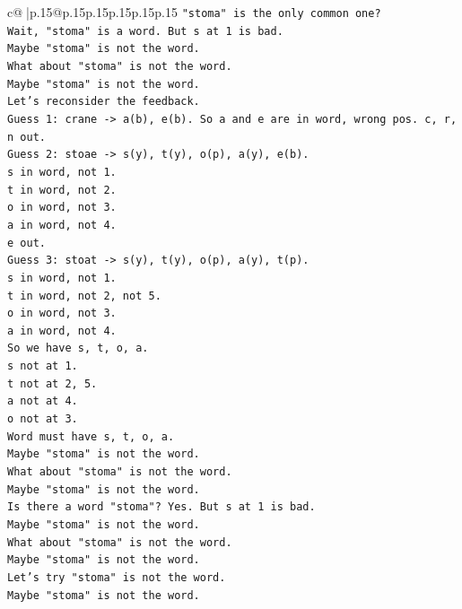 \documentclass{article}
\begin{document}
{\begin{supertabular}{c@{$\;$}|p{.15\linewidth}@{}p{.15\linewidth}p{.15\linewidth}p{.15\linewidth}p{.15\linewidth}p{.15\linewidth}}
{{{\texttt{"stoma" is the only common one?} \\
\texttt{Wait, "stoma" is a word. But s at 1 is bad.} \\
\texttt{Maybe "stoma" is not the word.} \\
\texttt{What about "stoma" is not the word.} \\
\texttt{Maybe "stoma" is not the word.} \\
\texttt{Let's reconsider the feedback.} \\
\texttt{Guess 1: crane {-}> a(b), e(b). So a and e are in word, wrong pos. c, r, n out.} \\
\texttt{Guess 2: stoae {-}> s(y), t(y), o(p), a(y), e(b).} \\
\texttt{s in word, not 1.} \\
\texttt{t in word, not 2.} \\
\texttt{o in word, not 3.} \\
\texttt{a in word, not 4.} \\
\texttt{e out.} \\
\texttt{Guess 3: stoat {-}> s(y), t(y), o(p), a(y), t(p).} \\
\texttt{s in word, not 1.} \\
\texttt{t in word, not 2, not 5.} \\
\texttt{o in word, not 3.} \\
\texttt{a in word, not 4.} \\
\texttt{So we have s, t, o, a.} \\
\texttt{s not at 1.} \\
\texttt{t not at 2, 5.} \\
\texttt{a not at 4.} \\
\texttt{o not at 3.} \\
\texttt{Word must have s, t, o, a.} \\
\texttt{Maybe "stoma" is not the word.} \\
\texttt{What about "stoma" is not the word.} \\
\texttt{Maybe "stoma" is not the word.} \\
\texttt{Is there a word "stoma"? Yes. But s at 1 is bad.} \\
\texttt{Maybe "stoma" is not the word.} \\
\texttt{What about "stoma" is not the word.} \\
\texttt{Maybe "stoma" is not the word.} \\
\texttt{Let's try "stoma" is not the word.} \\
\texttt{Maybe "stoma" is not the word.} \\
}}}
\end{supertabular}}
\end{document}
